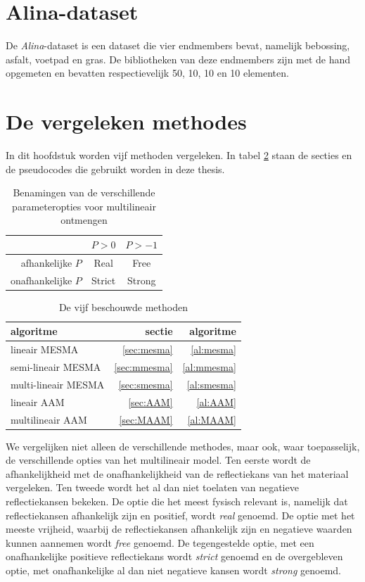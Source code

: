 \documentclass[12pt]{report}
\begin{document}
\section{Alina-dataset}

De \textit{Alina}-dataset is een dataset die vier endmembers bevat, namelijk bebossing, asfalt, voetpad en gras. De bibliotheken van deze endmembers zijn met de hand opgemeten en bevatten respectievelijk 50, 10, 10 en 10 elementen. 


\section{De vergeleken methodes}

In dit hoofdstuk worden vijf methoden vergeleken. In tabel \ref{tab:a} staan de secties en de pseudocodes die gebruikt worden  in deze thesis.  

\begin{table}
\Large\center
\begin{tabular}{r|c c}
&$P>0$&$P>-1$ \\
\hline
afhankelijke $P$ & Real & Free \\
onafhankelijke $P$ & Strict & Strong
\end{tabular}
\caption{Benamingen van de verschillende parameteropties voor multilineair ontmengen \label{tab:b}}
\end{table}


\begin{table}
\begin{tabular}{l r r}
algoritme & sectie & algoritme \\
\hline
lineair MESMA & \ref{sec:mesma} & \ref{al:mesma}\\
semi-lineair MESMA & \ref{sec:mmesma} &\ref{al:mmesma}\\
multi-lineair MESMA & \ref{sec:smesma} &\ref{al:smesma}\\
lineair AAM & \ref{sec:AAM}&\ref{al:AAM} \\
multilineair AAM & \ref{sec:MAAM} & \ref{al:MAAM} 
\end{tabular}
\caption{De vijf beschouwde methoden \label{tab:a}}
\end{table}


We vergelijken niet alleen de verschillende methodes, maar ook, waar toepasselijk, de verschillende opties van het multilineair model. Ten eerste wordt de afhankelijkheid met de onafhankelijkheid van de reflectiekans van het materiaal vergeleken. Ten tweede wordt het al dan niet toelaten van negatieve reflectiekansen bekeken. De optie die het meest fysisch relevant is, namelijk dat reflectiekansen afhankelijk zijn en positief, wordt \textit{real} genoemd. De optie met het meeste vrijheid, waarbij de reflectiekansen afhankelijk zijn en negatieve waarden kunnen aannemen wordt \textit{free} genoemd. De tegengestelde optie, met een onafhankelijke positieve reflectiekans wordt \textit{strict} genoemd en de overgebleven optie, met onafhankelijke al dan niet negatieve kansen wordt \textit{strong} genoemd. 
\end{document}
